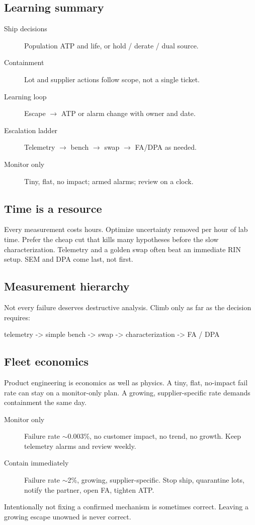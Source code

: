 \subsection{Learning summary}

\begin{description}
\item[Ship decisions] Population ATP and life, or hold / derate / dual source.
\item[Containment] Lot and supplier actions follow scope, not a single ticket.
\item[Learning loop] Escape $\to$ ATP or alarm change with owner and date.
\item[Escalation ladder] Telemetry $\to$ bench $\to$ swap $\to$ FA/DPA as needed.
\item[Monitor only] Tiny, flat, no impact; armed alarms; review on a clock.
\end{description}

\subsection{Time is a resource}

Every measurement costs hours. Optimize uncertainty removed per hour of lab
time. Prefer the cheap cut that kills many hypotheses before the slow
characterization. Telemetry and a golden swap often beat an immediate RIN
setup. SEM and DPA come last, not first.

\subsection{Measurement hierarchy}

Not every failure deserves destructive analysis. Climb only as far as the
decision requires:
\begin{dectree}
telemetry -> simple bench -> swap -> characterization -> FA / DPA
\end{dectree}

\subsection{Fleet economics}

Product engineering is economics as well as physics. A tiny, flat, no-impact
fail rate can stay on a monitor-only plan. A growing, supplier-specific rate
demands containment the same day.
\begin{description}
\item[Monitor only] Failure rate $\sim$0.003\%, no customer impact, no trend,
      no growth. Keep telemetry alarms and review weekly.
\item[Contain immediately] Failure rate $\sim$2\%, growing, supplier-specific.
      Stop ship, quarantine lots, notify the partner, open FA, tighten ATP.
\end{description}
Intentionally not fixing a confirmed mechanism is sometimes correct. Leaving a growing
escape unowned is never correct.

